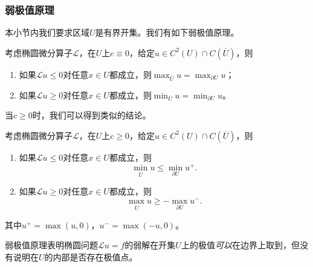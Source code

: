 \documentclass[a4paper,10pt]{ctexart}
\begin{document}
\subsubsection{弱极值原理}
本小节内我们要求区域$ U $是有界开集。我们有如下弱极值原理。
\begin{theorem}
    考虑椭圆微分算子$ \mathcal{L} $，在$ U $上$ c\equiv 0 $，给定$ u\in C^2(U)\cap C(\overline{U}) $，则
    \begin{enumerate}
        \item 如果$ \mathcal{L}u\leqslant 0 $对任意$ x\in U $都成立，则$ \max_{\overline{U}} u = \max_{\partial U} u $；
        \item 如果$ \mathcal{L}u\geqslant 0 $对任意$ x\in U $都成立，则$ \min_{\overline{U}} u = \min_{\partial U} u $。
    \end{enumerate}
\end{theorem}
当$ c\geqslant 0 $时，我们可以得到类似的结论。
\begin{theorem}
    考虑椭圆微分算子$ \mathcal{L} $，在$ U $上$ c\geqslant 0 $，给定$ u\in C^2(U)\cap C(\overline{U}) $，则
    \begin{enumerate}
        \item 如果$ \mathcal{L}u\leqslant 0 $对任意$ x\in U $都成立，则
        \begin{equation}
            \min_{\overline{U}} u \leqslant  \min_{\partial U} u^+.
        \end{equation}
        \item 如果$ \mathcal{L}u\geqslant 0 $对任意$ x\in U $都成立，则
        \begin{equation}
            \max_{\overline{U}} u \geqslant  -\max_{\partial U} u^-.
        \end{equation}
    \end{enumerate}
    其中$ u^+ = \max(u,0) $，$ u^- = \max(-u,0) $。
\end{theorem}
弱极值原理表明椭圆问题$ \mathcal{L}u = f $的弱解在开集$ U $上的极值\emph{可以}在边界上取到，但没有说明在$ U $的内部是否存在极值点。
\end{document}
